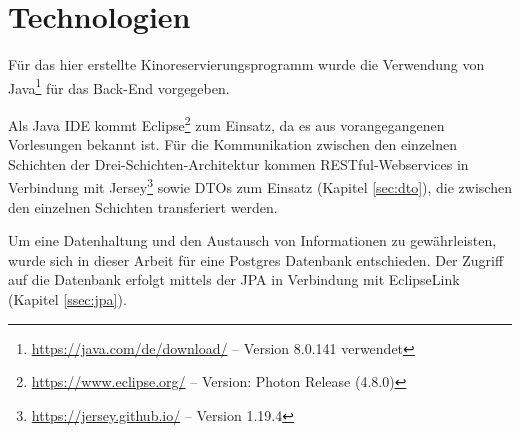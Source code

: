 \section{Technologien}
\label{sec:technologien}
Für das hier erstellte Kinoreservierungsprogramm wurde die Verwendung von Java\footnote{\url{https://java.com/de/download/} -- Version 8.0.141 verwendet} für das Back-End vorgegeben. 

Als Java \acs{IDE} kommt Eclipse\footnote{\url{https://www.eclipse.org/} -- Version: Photon Release (4.8.0)} zum Einsatz, da es aus vorangegangenen Vorlesungen bekannt ist.
Für die Kommunikation zwischen den einzelnen Schichten der Drei-Schichten-Architektur kommen \acs{REST}ful-Webservices in Verbindung mit Jersey\footnote{\url{https://jersey.github.io/} -- Version 1.19.4} sowie \acp{DTO} zum Einsatz (Kapitel \vref{sec:dto}), die zwischen den einzelnen Schichten transferiert werden. 

Um eine Datenhaltung und den Austausch von Informationen zu gewährleisten, wurde sich in dieser Arbeit für eine Postgres Datenbank entschieden.
Der Zugriff auf die Datenbank erfolgt mittels der \ac{JPA} in Verbindung mit EclipseLink (Kapitel \vref{ssec:jpa}).  